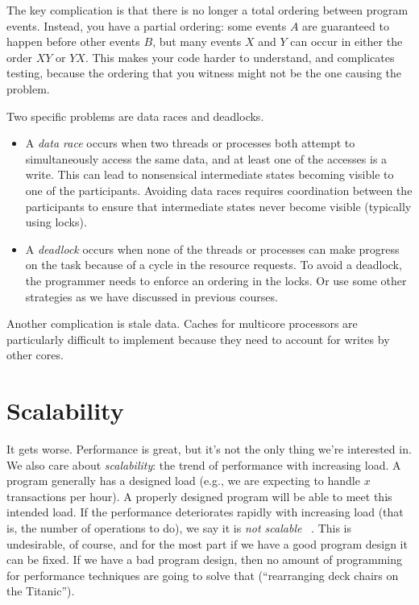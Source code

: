 The key complication is that there is no longer a total ordering between
program events. Instead, you have a partial ordering: some events $A$
are guaranteed to happen before other events $B$, but many events $X$ 
and $Y$ can occur in either the order $XY$ or $YX$. This makes your code
harder to understand, and complicates testing, because the ordering that
you witness might not be the one causing the problem.

Two specific problems are data races and deadlocks. 
\begin{itemize}
\item A
\emph{data race} occurs when two threads or processes both attempt to
simultaneously access the same data, and at least one of the accesses
is a write. This can lead to nonsensical intermediate states becoming
visible to one of the participants. Avoiding data races requires
coordination between the participants to ensure that intermediate
states never become visible (typically using locks). 
\item A \emph{deadlock}
occurs when none of the threads or processes can make progress on the
task because of a cycle in the resource requests. To avoid a deadlock,
the programmer needs to enforce an ordering in the locks. Or use some other strategies as we have discussed in previous courses.
\end{itemize}

Another complication is stale data. Caches for multicore processors
are particularly difficult to implement because they need to account
for writes by other cores.

\section*{Scalability}

It gets worse. Performance is great, but it's not the only thing we're interested in. We also care about \textit{scalability}: the trend of performance with increasing load. A program generally has a designed load (e.g., we are expecting to handle $x$ transactions per hour). A properly designed program will be able to meet this intended load. If the performance deteriorates rapidly with increasing load (that is, the number of operations to do), we say it is \textit{not scalable} ~\cite{swps}. This is undesirable, of course, and for the most part if we have a good program design it can be fixed. If we have a bad program design, then no amount of programming for performance techniques are going to solve that (``rearranging deck chairs on the Titanic'').

